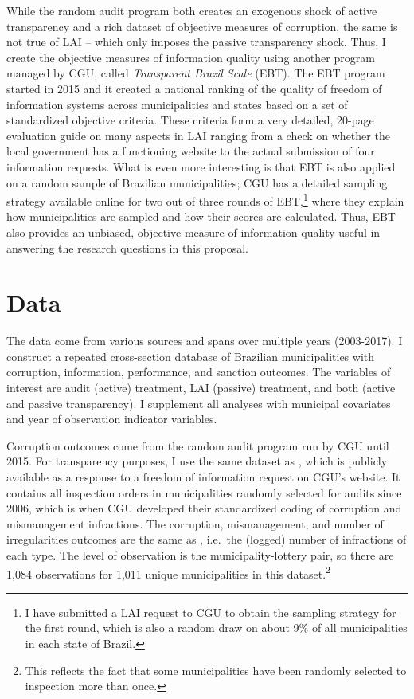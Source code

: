 \documentclass[11pt]{article}
\begin{document}
While the random audit program both creates an exogenous shock of active transparency and a rich dataset of objective measures of corruption, the same is not true of LAI -- which only imposes the passive transparency shock. Thus, I create the objective measures of information quality using another program managed by CGU, called \emph{Transparent Brazil Scale} (EBT). The EBT program started in 2015 and it created a national ranking of the quality of freedom of information systems across municipalities and states based on a set of standardized objective criteria. These criteria form a very detailed, 20-page evaluation guide on many aspects in LAI ranging from a check on whether the local government has a functioning website to the actual submission of four information requests. What is even more interesting is that EBT is also applied on a random sample of Brazilian municipalities; CGU has a detailed sampling strategy available online for two out of three rounds of EBT,\footnote{I have submitted a LAI request to CGU to obtain the sampling strategy for the first round, which is also a random draw on about 9\% of all municipalities in each state of Brazil.} where they explain how municipalities are sampled and how their scores are calculated. Thus, EBT also provides an unbiased, objective measure of information quality useful in answering the research questions in this proposal.

\section{Data} \label{sec:data_paper3}

The data come from various sources and spans over multiple years (2003-2017). I construct a repeated cross-section database of Brazilian municipalities with corruption, information, performance, and sanction outcomes. The variables of interest are audit (active) treatment, LAI (passive) treatment, and both (active and passive transparency). I supplement all analyses with municipal covariates and year of observation indicator variables.

Corruption outcomes come from the random audit program run by CGU until 2015. For transparency purposes, I use the same dataset as \citet{AvisGovernmentAuditsReduce2018}, which is publicly available as a response to a freedom of information request on CGU's website. It contains all inspection orders in municipalities randomly selected for audits since 2006, which is when CGU developed their standardized coding of corruption and mismanagement infractions. The corruption, mismanagement, and number of irregularities outcomes are the same as \citet{AvisGovernmentAuditsReduce2018}, i.e.~the (logged) number of infractions of each type. The level of observation is the municipality-lottery pair, so there are 1,084 observations for 1,011 unique municipalities in this dataset.\footnote{This reflects the fact that some municipalities have been randomly selected to inspection more than once.}
\end{document}
